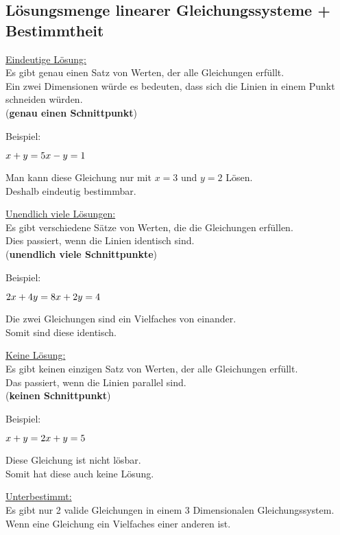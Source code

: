 \subsection{Lösungsmenge linearer Gleichungssysteme + Bestimmtheit}

\underline{Eindeutige Lösung:} \\
Es gibt genau einen Satz von Werten, der alle Gleichungen erfüllt. \\
Ein zwei Dimensionen würde es bedeuten, dass sich die Linien in einem Punkt schneiden würden. \\
(\textbf{genau einen Schnittpunkt})

Beispiel: 

$
x + y = 5 \\
x - y = 1 
$

Man kann diese Gleichung nur mit $x = 3$ und $y = 2$ Lösen. \\
Deshalb eindeutig bestimmbar.

\bigskip

\underline{Unendlich viele Lösungen:} \\
Es gibt verschiedene Sätze von Werten, die die Gleichungen erfüllen. \\
Dies passiert, wenn die Linien identisch sind. \\
(\textbf{unendlich viele Schnittpunkte})

Beispiel:

$
2x + 4y = 8 \\
x + 2y = 4
$

Die zwei Gleichungen sind ein Vielfaches von einander. \\
Somit sind diese identisch. 

\bigskip

\underline{Keine Lösung:} \\
Es gibt keinen einzigen Satz von Werten, der alle Gleichungen erfüllt. \\
Das passiert, wenn die Linien parallel sind. \\
(\textbf{keinen Schnittpunkt})

Beispiel:

$x + y = 2 \\ 
x + y = 5$

Diese Gleichung ist nicht lösbar. \\
Somit hat diese auch keine Lösung.

\bigskip

\underline{Unterbestimmt:} \\
Es gibt nur 2 valide Gleichungen in einem 3 Dimensionalen Gleichungssystem. \\
Wenn eine Gleichung ein Vielfaches einer anderen ist.

